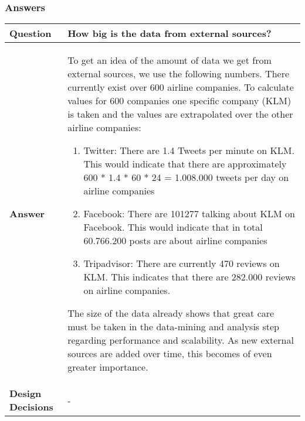 \subsubsection{Answers}
\newpage
\begin{longtable}{| l |  p{12cm} |}
\hline
\textbf{Question} & \textbf{How big is the data from external sources?} \\ \hline
\textbf{Answer} &
	To get an idea of the amount of data we get from external sources, we use the following numbers. There currently exist over 600 airline companies. To calculate values for 600 companies one specific company (KLM) is taken and the values are extrapolated over the other airline companies:
\begin{enumerate}
\item Twitter: There are 1.4 Tweets per minute on KLM. This would indicate that there are approximately 600 * 1.4 * 60 * 24 = 1.008.000 tweets per day on airline companies
\item Facebook: There are 101277 talking about KLM on Facebook. This would indicate that in total 60.766.200 posts are about airline companies
\item Tripadvisor: There are currently 470 reviews on KLM. This indicates that there are 282.000 reviews on airline companies.
\end{enumerate}
The size of the data already shows that great care must be taken in the data-mining and analysis step regarding performance and scalability. As new external sources are added over time, this becomes of even greater importance. \\ \hline
\textbf{Design Decisions} & - \\ \hline
\end{longtable}

